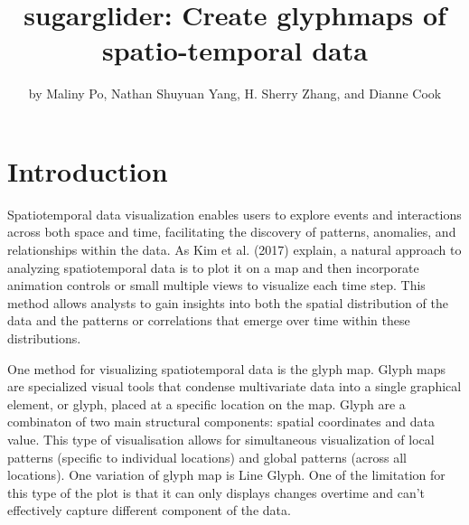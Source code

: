 \title{sugarglider: Create glyphmaps of spatio-temporal data}


\author{by Maliny Po, Nathan Shuyuan Yang, H. Sherry Zhang, and Dianne Cook}

\maketitle


\hypertarget{introduction}{%
\section{Introduction}\label{introduction}}

Spatiotemporal data visualization enables users to explore events and interactions across both space and time, facilitating the discovery of patterns, anomalies, and relationships within the data. As Kim et al. (2017) explain, a natural approach to analyzing spatiotemporal data is to plot it on a map and then incorporate animation controls or small multiple views to visualize each time step. This method allows analysts to gain insights into both the spatial distribution of the data and the patterns or correlations that emerge over time within these distributions.

One method for visualizing spatiotemporal data is the glyph map. Glyph maps are specialized visual tools that condense multivariate data into a single graphical element, or glyph, placed at a specific location on the map. Glyph are a combinaton of two main structural components: spatial coordinates and data value. This type of visualisation allows for simultaneous visualization of local patterns (specific to individual locations) and global patterns (across all locations). One variation of glyph map is Line Glyph. One of the limitation for this type of the plot is that it can only displays changes overtime and can't effectively capture different component of the data.

